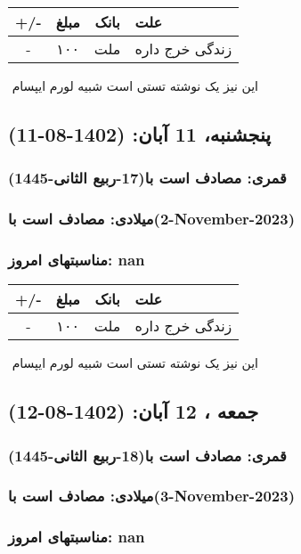 \documentclass{article}
\newcommand{\rnote}[1]{\marginpar{\textcolor{color}{\StrSubstitute{\##1}{ }{\_}}}}
\newcommand{\myRow}[4]{
    #1 & #2 & #3 & #4 \\ \hline
}
\begin{document}
\begin{tabular}{ | c | c | c | p{5cm} |}
    \hline
    \myRow{ +/- }{مبلغ}{بانک}{علت}
    \myRow{-}{۱۰۰}{ملت}{زندگی خرج داره}
\end{tabular}
\newline
\newline

‌
\rnote{تست}
این نیز یک نوشته تستی است شبیه لورم ایپسام




\newpage
{}
\textcolor{color}{
\section{ پنجشنبه، 11 آبان: (1402-08-11) }
\subsubsection*{قمری: مصادف است با(17-ربیع الثانی-1445)} 
\subsubsection*{میلادی: مصادف است با(2-November-2023)}
\subsubsection*{مناسبتهای امروز: nan}
}


\begin{tabular}{ | c | c | c | p{5cm} |}
    \hline
    \myRow{ +/- }{مبلغ}{بانک}{علت}
    \myRow{-}{۱۰۰}{ملت}{زندگی خرج داره}
\end{tabular}
\newline
\newline

‌
\rnote{تست}
این نیز یک نوشته تستی است شبیه لورم ایپسام




\newpage
{}
\textcolor{color}{
\section{ جمعه ، 12 آبان: (1402-08-12) }
\subsubsection*{قمری: مصادف است با(18-ربیع الثانی-1445)} 
\subsubsection*{میلادی: مصادف است با(3-November-2023)}
\subsubsection*{مناسبتهای امروز: nan}
}
\end{document}
